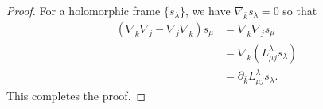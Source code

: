 \documentclass{article}
\numberwithin{equation}{section}
\theoremstyle{definition}
\theoremstyle{theorem}
\begin{document}
\begin{proof}
For a holomorphic frame $\{s_\lambda\}$, we have $\nabla_{\bar{k}} s_\lambda =0$ so that   
\begin{align*}
 (\nabla_{\bar{k}}\nabla_j - \nabla_{j}\nabla_{\bar{k}}) s_\mu &= \nabla_{\bar{k}} \nabla_j s_\mu \\
 &= \nabla_{\bar{k}} (L^{\lambda}_{\mu j} s_\lambda) \\
&= \partial_{\bar{k}} L^{\lambda}_{\mu j} s_\lambda.
\end{align*}
This completes the proof. 
\end{proof}
\end{document}
